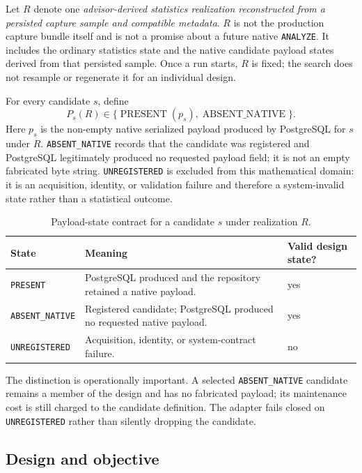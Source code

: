 Let $R$ denote one \emph{advisor-derived statistics realization reconstructed
from a persisted capture sample and compatible metadata}.  $R$ is not the
production capture bundle itself and is not a promise about a future native
\texttt{ANALYZE}.  It includes the ordinary statistics state and the native
candidate payload states derived from that persisted sample.  Once a run
starts, $R$ is fixed; the search does not resample or regenerate it for an
individual design.

For every candidate $s$, define
\[
 P_s(R)\in\{\operatorname{PRESENT}(p_s),\operatorname{ABSENT\_NATIVE}\}.
\]
Here $p_s$ is the non-empty native serialized payload produced by PostgreSQL
for $s$ under $R$.  \texttt{ABSENT\_NATIVE} records that the candidate was
registered and PostgreSQL legitimately produced no requested payload field;
it is not an empty fabricated byte string.  \texttt{UNREGISTERED} is excluded
from this mathematical domain: it is an acquisition, identity, or validation
failure and therefore a system-invalid state rather than a statistical
outcome.

\begin{table}[t]
\caption{Payload-state contract for a candidate $s$ under realization $R$.}
\label{tab:payload-states}
\centering
\small
\begin{tabular}{@{}p{}p{}p{}@{}}
\toprule
State & Meaning & Valid design state? \\
\midrule
\texttt{PRESENT} & PostgreSQL produced and the repository retained a native payload. & yes \\
\texttt{ABSENT\_NATIVE} & Registered candidate; PostgreSQL produced no requested native payload. & yes \\
\texttt{UNREGISTERED} & Acquisition, identity, or system-contract failure. & no \\
\bottomrule
\end{tabular}
\end{table}

The distinction is operationally important.  A selected
\texttt{ABSENT\_NATIVE} candidate remains a member of the design and has no
fabricated payload; its maintenance cost is still charged to the candidate
definition.  The adapter fails closed on \texttt{UNREGISTERED} rather than
silently dropping the candidate.

\subsection{Design and objective}

